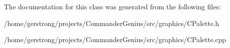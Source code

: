 The documentation for this class was generated from the following files:\begin{DoxyCompactItemize}
\item 
/home/gerstrong/projects/CommanderGenius/src/graphics/CPalette.h\item 
/home/gerstrong/projects/CommanderGenius/src/graphics/CPalette.cpp\end{DoxyCompactItemize}
